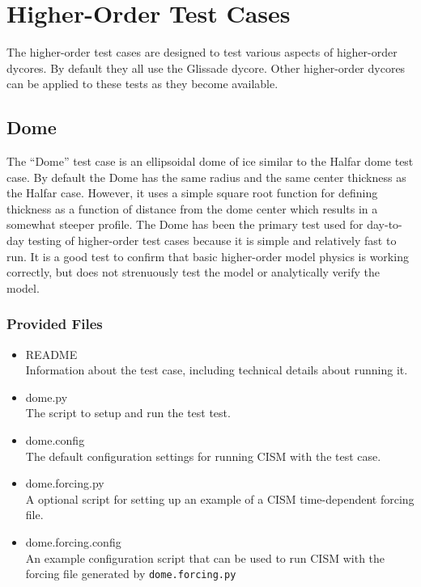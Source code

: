 
\section{Higher-Order Test Cases}

The higher-order test cases are designed to test various aspects of higher-order dycores.
By default they all use the Glissade dycore.  Other higher-order dycores can be applied
to these tests as they become available.

\subsection{Dome}
The ``Dome'' test case is an ellipsoidal dome of ice similar to the Halfar dome test case.
By default the Dome has the same radius and the same center thickness as the Halfar case.
However, it uses a simple square root function for defining thickness as a function 
of distance from the dome center which results in a somewhat steeper profile.  
The Dome has been the primary test used for day-to-day testing of higher-order
test cases because it is simple and relatively fast to run.  It is a good test
to confirm that basic higher-order model physics is working correctly, but does
not strenuously test the model or analytically verify the model.

\subsubsection{Provided Files}

\begin{itemize}
	\item README \\
		Information about the test case, including technical details about running it.
	\item dome.py \\
		The script to setup and run the test test.
  \item dome.config \\
  The default configuration settings for running CISM with the test case.
	\item dome.forcing.py \\
		A optional script for setting up an example of a CISM time-dependent forcing file.
  \item dome.forcing.config \\
  An example configuration script that can be used to run CISM with the forcing file
  generated by \texttt{dome.forcing.py}
\end{itemize}

